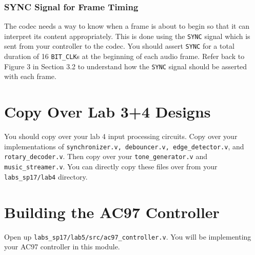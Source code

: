 \documentclass[11pt]{article}
\begin{document}
\subsubsection{SYNC Signal for Frame Timing}
The codec needs a way to know when a frame is about to begin so that it can interpret its content appropriately. This is done using the \verb|SYNC| signal which is sent from your controller to the codec. You should assert \verb|SYNC| for a total duration of 16 \verb|BIT_CLK|s at the beginning of each audio frame. Refer back to Figure 3 in Section 3.2 to understand how the \verb|SYNC| signal should be asserted with each frame.

\section{Copy Over Lab 3+4 Designs}
You should copy over your lab 4 input processing circuits. Copy over your implementations of \verb|synchronizer.v, debouncer.v, edge_detector.v|, and \verb|rotary_decoder.v|. Then copy over your \verb|tone_generator.v| and \verb|music_streamer.v|. You can directly copy these files over from your \verb|labs_sp17/lab4| directory.

\section{Building the AC97 Controller}

Open up \verb|labs_sp17/lab5/src/ac97_controller.v|. You will be implementing your AC97 controller in this module.
\end{document}
